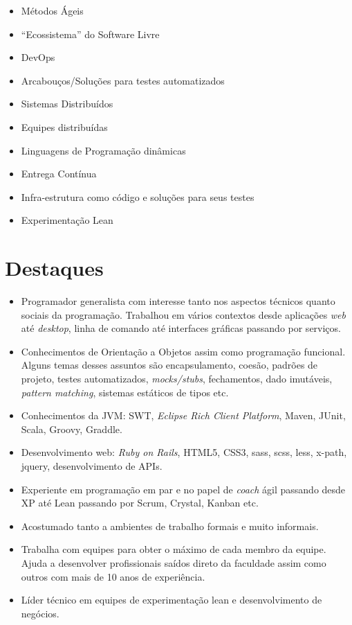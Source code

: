 \documentclass[letter,10pt]{article}
\begin{document}
\begin{itemize}
\item Métodos Ágeis
\item ``Ecossistema'' do Software Livre
\item DevOps
\item Arcabouços/Soluções para testes automatizados
\item Sistemas Distribuídos
\item Equipes distribuídas
\item Linguagens de Programação dinâmicas
\item Entrega Contínua
\item Infra-estrutura como código e soluções para seus testes
\item Experimentação Lean
\end{itemize}

\section{Destaques}

\begin{itemize}
\item Programador generalista com interesse tanto nos aspectos
  técnicos quanto sociais da programação. Trabalhou em vários contextos desde aplicações \textit{web} até \textit{desktop}, linha de comando até interfaces
  gráficas passando por serviços.
\item Conhecimentos de Orientação a Objetos assim como programação funcional. Alguns temas desses assuntos são encapsulamento, coesão, padrões de projeto,  testes automatizados, \textit{mocks/stubs}, fechamentos, dado imutáveis, \textit{pattern matching}, sistemas estáticos de tipos etc.
\item Conhecimentos da JVM: SWT, \textit{Eclipse Rich Client Platform}, Maven, JUnit, Scala, Groovy, Graddle.
\item Desenvolvimento web: \textit{Ruby on Rails}, HTML5, CSS3, sass, scss, less, x-path, jquery, desenvolvimento de APIs.
\item Experiente em programação em par e no papel de \textit{coach}
  ágil passando desde XP até Lean passando por Scrum, Crystal, Kanban etc.
\item Acostumado tanto a ambientes de trabalho formais e muito
  informais.
\item Trabalha com equipes para obter o máximo de cada membro da equipe. Ajuda a desenvolver profissionais saídos direto da faculdade assim como outros com mais de 10 anos de experiência.
\item Líder técnico em equipes de experimentação lean e desenvolvimento de negócios.
\end{itemize}
\end{document}
